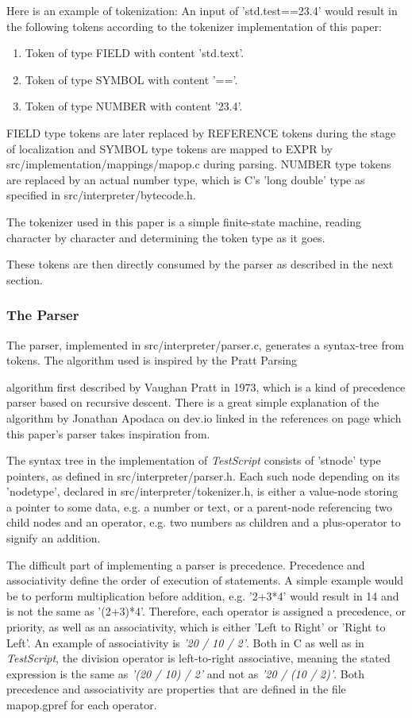 \documentclass[12pt,a4paper]{article}
\newcommand{\cte}[1] {
    \cite{#1}
}
\newcommand{\name}{\emph{TestScript}}
\begin{document}
Here is an example of tokenization:
An input of 'std.test==23.4' would result in the following tokens according
to the tokenizer implementation of this paper:
\begin{enumerate}
    \item Token of type FIELD with content 'std.text'.
    \item Token of type SYMBOL with content '=='.
    \item Token of type NUMBER with content '23.4'.
\end{enumerate}
FIELD type tokens are later replaced by REFERENCE tokens during the stage of localization
and SYMBOL type tokens are mapped to EXPR by src/implementation/mappings/mapop.c
during parsing. NUMBER type tokens are replaced by an actual number type, which
is C's 'long double' type as specified in src/interpreter/bytecode.h.

The tokenizer used in this paper is a simple finite-state machine, reading
character by character and determining the token type as it goes.

These tokens are then directly consumed by the parser as described in the next
section.

\subsubsection{The Parser}
The parser, implemented in src/interpreter/parser.c, generates a syntax-tree
from tokens. The algorithm used is inspired by the Pratt Parsing\cte{pratt}
algorithm first described by Vaughan Pratt in 1973, which is a kind of precedence
parser based on recursive descent. There is a great simple explanation of the algorithm
by Jonathan Apodaca on dev.io\cte{devio} linked in the references on page 
\pageref{bibliography} which this paper's parser takes inspiration from.

The syntax tree in the implementation of \name{} consists of 'stnode' type
pointers, as defined in src/interpreter/parser.h. Each such node depending
on its 'nodetype', declared in src/interpreter/tokenizer.h,
is either a value-node storing a pointer to some data, e.g. a number or text, or a
parent-node referencing two child nodes and an operator, e.g. two numbers as
children and a plus-operator to signify an addition.

The difficult part of implementing a parser is precedence. Precedence and
associativity define the order of execution of statements. A simple example
would be to perform multiplication before addition, e.g. '2+3*4' would
result in 14 and is not the same as '(2+3)*4'. Therefore, each operator is
assigned a precedence, or priority, as well as an associativity, which is
either 'Left to Right' or 'Right to Left'. An example of associativity is
\emph{'20 / 10 / 2'}. Both in C as well as in \name{}, the division operator is
left-to-right associative, meaning the stated expression is the same as
\emph{'(20 / 10) / 2'} and not as \emph{'20 / (10 / 2)'}. Both precedence 
and associativity are properties that are defined in the file mapop.gpref for
each operator.
\end{document}
